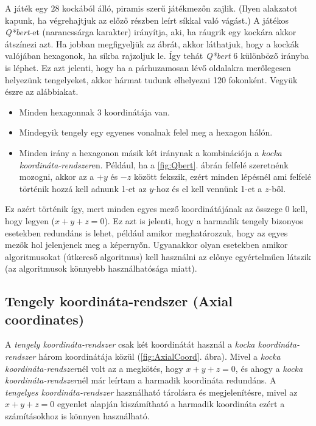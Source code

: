 A játék egy $28$ kockából álló, piramis szerű játékmezőn zajlik. (Ilyen alakzatot kapunk, ha végrehajtjuk az előző részben leírt síkkal való vágást.) A játékos \textit{Q*bert}-et (narancssárga karakter) irányítja, aki, ha ráugrik egy kockára akkor átszínezi azt. Ha jobban megfigyeljük az ábrát, akkor láthatjuk, hogy a kockák valójában hexagonok, ha síkba rajzoljuk le. Így tehát \textit{Q*bert} 6 különböző irányba is léphet. Ez azt jelenti, hogy ha a párhuzamosan lévő oldalakra merőlegesen helyezünk tengelyeket, akkor hármat tudunk elhelyezni 120 fokonként. Vegyük észre az alábbiakat.
\begin{itemize}
\item Minden hexagonnak 3 koordinátája van. 
\item Mindegyik tengely egy egyenes vonalnak felel meg a hexagon hálón.
\item Minden irány a hexagonon másik két iránynak a kombinációja a \textit{kocka koordináta-rendszer}en. Például, ha a \ref{fig:Qbert}. ábrán felfelé szeretnénk mozogni, akkor az a $+y$ és $-z$ között fekszik, ezért minden lépésnél ami felfelé történik hozzá kell adnunk 1-et az $y$-hoz és el kell vennünk 1-et a $z$-ből. 
\end{itemize}
Ez azért történik így, mert minden egyes mező koordinátájának az összege $0$ kell, hogy legyen ($x + y + z = 0$). Ez azt is jelenti, hogy a harmadik tengely bizonyos esetekben redundáns is lehet, például amikor meghatározzuk, hogy az egyes mezők hol jelenjenek meg a képernyőn. Ugyanakkor olyan esetekben amikor algoritmusokat (útkereső algoritmus) kell használni az előnye egyértelműen látszik (az algoritmusok könnyebb használhatósága miatt). 

\subsection{Tengely koordináta-rendszer (Axial coordinates)}

A \textit{tengely koordináta-rendszer} csak két koordinátát használ a \textit{kocka koordináta-rendszer} három koordinátája közül (\ref{fig:AxialCoord}. ábra). Mivel a \textit{kocka koordináta-rendszer}nél volt az a megkötés, hogy $x + y + z = 0$, és ahogy a \textit{kocka koordináta-rendszer}nél már leírtam a harmadik koordináta redundáns.  A \textit{tengelyes koordináta-rendszer} használható tárolásra és megjelenítésre, mivel az $x + y + z = 0$ egyenlet alapján kiszámítható a harmadik koordináta ezért a számításokhoz is könnyen használható.

